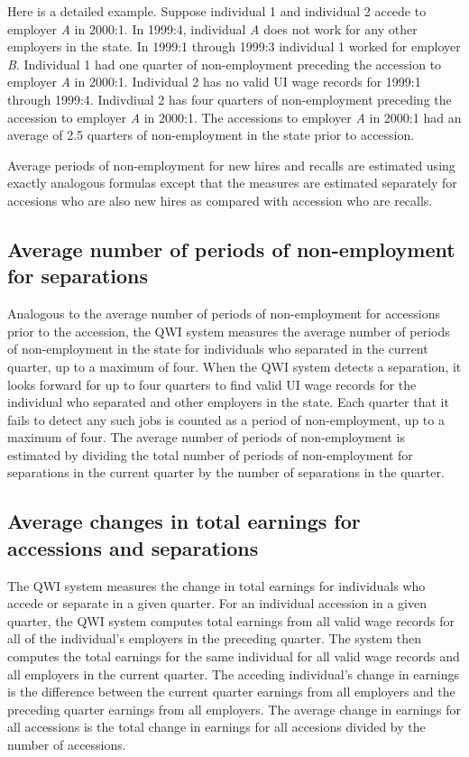 Here is a detailed example. Suppose individual 1 and individual 2 accede to
employer \textit{A} in 2000:1. In 1999:4, individual \textit{A} does not
work for any other employers in the state. In 1999:1 through 1999:3
individual 1 worked for employer \textit{B}. Individual 1 had one quarter of
non-employment preceding the accession to employer \textit{A} in 2000:1.
Individual 2 has no valid {UI} wage records for 1999:1 through
1999:4. Indivdiual 2 has four quarters of non-employment preceding the
accession to employer \textit{A} in 2000:1. The accessions to employer 
\textit{A} in 2000:1 had an average of 2.5 quarters of non-employment in the
state prior to accession.

Average periods of non-employment for new hires and recalls are estimated
using exactly analogous formulas except that the measures are estimated
separately for accesions who are also new hires as compared with accession
who are recalls.

\subsection{Average number of periods of non-employment for separations}


Analogous to the average number of periods of non-employment for accessions
prior to the accession, the QWI system measures the average number of
periods of non-employment in the state for individuals who separated in the
current quarter, up to a maximum of four. When the QWI system detects a
separation, it looks forward for up to four quarters to find valid %
UI wage records for the individual who separated and other
employers in the state. Each quarter that it fails to detect any such jobs
is counted as a period of non-employment, up to a maximum of four. The
average number of periods of non-employment is estimated by dividing the
total number of periods of non-employment for separations in the current
quarter by the number of separations in the quarter.

\subsection{Average changes in total earnings for accessions and separations}

 

The QWI system measures the change in total earnings for individuals who
accede or separate in a given quarter. For an individual accession in a
given quarter, the QWI system computes total earnings from all valid wage
records for all of the individual's employers in the preceding quarter. The
system then computes the total earnings for the same individual for all
valid wage records and all employers in the current quarter. The acceding
individual's change in earnings is the difference between the current
quarter earnings from all employers and the preceding quarter earnings from
all employers. The average change in earnings for all accessions is the
total change in earnings for all accesions divided by the number of
accessions.

